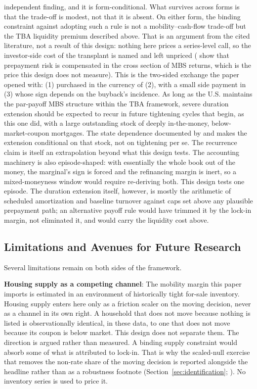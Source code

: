 \documentclass[12pt]{article}
\begin{document}
independent finding, and it is form-conditional. What survives across forms is that the trade-off is modest, not that it is absent. On either form, the binding constraint against adopting such a rule is not a mobility--cash-flow trade-off but the TBA liquidity premium described above. That is an argument from the cited literature, not a result of this design: nothing here prices a series-level call, so the investor-side cost of the transplant is named and left unpriced (\citet{diep2021} show that prepayment risk is compensated in the cross section of MBS returns, which is the price this design does not measure). This is the two-sided exchange the paper opened with: (1) purchased in the currency of (2), with a small side payment in (3) whose sign depends on the buyback's incidence. As long as the U.S. maintains the par-payoff MBS structure within the TBA framework, severe duration extension should be expected to recur in future tightening cycles that begin, as this one did, with a large outstanding stock of deeply in-the-money, below-market-coupon mortgages. The state dependence documented by \citet{berger2021} and \citet{eichenbaum2022} makes the extension conditional on that stock, not on tightening per se. The recurrence claim is itself an extrapolation beyond what this design tests. The accounting machinery is also episode-shaped: with essentially the whole book out of the money, the marginal's sign is forced and the refinancing margin is inert, so a mixed-moneyness window would require re-deriving both. This design tests one episode. The duration extension itself, however, is mostly the arithmetic of scheduled amortization and baseline turnover against caps set above any plausible prepayment path; an alternative payoff rule would have trimmed it by the lock-in margin, not eliminated it, and would carry the liquidity cost above.

\subsection{Limitations and Avenues for Future Research}\label{sec:limitations}

Several limitations remain on both sides of the framework.

\textbf{Housing supply as a competing channel}: The mobility margin this paper imports is estimated in an environment of historically tight for-sale inventory. Housing supply enters here only as a friction scaler on the moving decision, never as a channel in its own right. A household that does not move because nothing is listed is observationally identical, in these data, to one that does not move because its coupon is below market. This design does not separate them. The direction is argued rather than measured. A binding supply constraint would absorb some of what is attributed to lock-in. That is why the scaled-null exercise that removes the non-rate share of the moving decision is reported alongside the headline rather than as a robustness footnote (Section~\ref{sec:identification}; \citealp{aladangady2024,hsieh2019}). No inventory series is used to price it.
\end{document}
